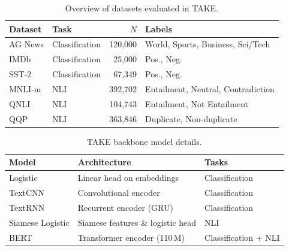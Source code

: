 \begin{table}[ht]
  \centering
  \begin{threeparttable}
    \caption{Overview of datasets evaluated in TAKE.}
    \label{tab:54-research03-experiments-datasets}
    \begin{tabular}{l l r l}
      \toprule
      \textbf{Dataset} & \textbf{Task} & $N$ & \textbf{Labels} \\
      \midrule
      AG News   & Classification & 120,000 & World, Sports, Business, Sci/Tech \\
      IMDb      & Classification &  25,000 & Pos., Neg. \\
      SST-2     & Classification &  67,349 & Pos., Neg. \\
      MNLI-m    & NLI            & 392,702 & Entailment, Neutral, Contradiction \\
      QNLI      & NLI            & 104,743 & Entailment, Not Entailment \\
      QQP       & NLI            & 363,846 & Duplicate, Non-duplicate \\
      \bottomrule
    \end{tabular}
  \end{threeparttable}
\end{table}

\begin{table}[ht]
  \centering
  \begin{threeparttable}
    \caption{TAKE backbone model details.}
    \label{tab:54-research03-experiments-backbones}
    \begin{tabular}{l l l}
      \toprule
      \textbf{Model}        & \textbf{Architecture}             & \textbf{Tasks} \\
      \midrule
      Logistic              & Linear head on embeddings         & Classification \\
      TextCNN               & Convolutional encoder             & Classification \\
      TextRNN               & Recurrent encoder (GRU)           & Classification \\
      Siamese Logistic      & Siamese features \& logistic head & NLI \\
      BERT                  & Transformer encoder (110\,M)      & Classification + NLI \\
      \bottomrule
    \end{tabular}
  \end{threeparttable}
\end{table}

